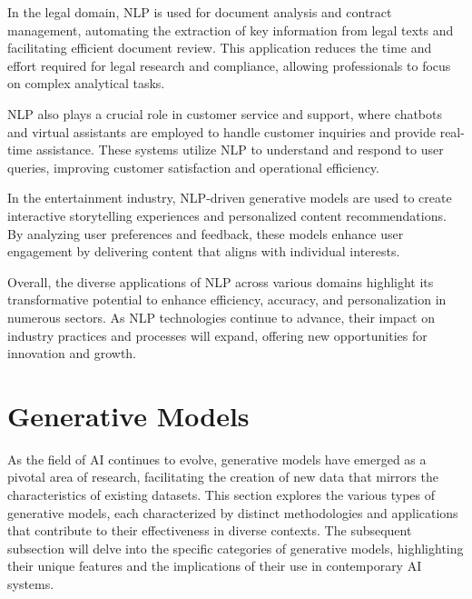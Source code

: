 In the legal domain, NLP is used for document analysis and contract management, automating the extraction of key information from legal texts and facilitating efficient document review. This application reduces the time and effort required for legal research and compliance, allowing professionals to focus on complex analytical tasks.



NLP also plays a crucial role in customer service and support, where chatbots and virtual assistants are employed to handle customer inquiries and provide real-time assistance. These systems utilize NLP to understand and respond to user queries, improving customer satisfaction and operational efficiency.



In the entertainment industry, NLP-driven generative models are used to create interactive storytelling experiences and personalized content recommendations. By analyzing user preferences and feedback, these models enhance user engagement by delivering content that aligns with individual interests.



Overall, the diverse applications of NLP across various domains highlight its transformative potential to enhance efficiency, accuracy, and personalization in numerous sectors. As NLP technologies continue to advance, their impact on industry practices and processes will expand, offering new opportunities for innovation and growth.









\section{Generative Models} \label{sec:Generative Models}

As the field of AI continues to evolve, generative models have emerged as a pivotal area of research, facilitating the creation of new data that mirrors the characteristics of existing datasets. This section explores the various types of generative models, each characterized by distinct methodologies and applications that contribute to their effectiveness in diverse contexts. The subsequent subsection will delve into the specific categories of generative models, highlighting their unique features and the implications of their use in contemporary AI systems.





